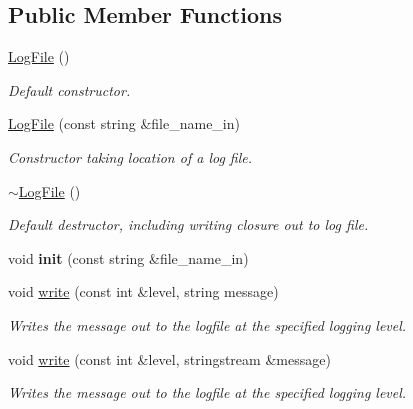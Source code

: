 \subsection*{Public Member Functions}
\begin{DoxyCompactItemize}
\item 
\hyperlink{class_log_file_ad11b3baf5602575c1396f726d3598188}{Log\+File} ()\hypertarget{class_log_file_ad11b3baf5602575c1396f726d3598188}{}\label{class_log_file_ad11b3baf5602575c1396f726d3598188}

\begin{DoxyCompactList}\small\item\em Default constructor. \end{DoxyCompactList}\item 
\hyperlink{class_log_file_a0b1339474eda3eb8bed23dce67fa55b0}{Log\+File} (const string \&file\+\_\+name\+\_\+in)
\begin{DoxyCompactList}\small\item\em Constructor taking location of a log file. \end{DoxyCompactList}\item 
\hyperlink{class_log_file_a440a7de2dcbb9facb68e56dc47cb9dea}{$\sim$\+Log\+File} ()\hypertarget{class_log_file_a440a7de2dcbb9facb68e56dc47cb9dea}{}\label{class_log_file_a440a7de2dcbb9facb68e56dc47cb9dea}

\begin{DoxyCompactList}\small\item\em Default destructor, including writing closure out to log file. \end{DoxyCompactList}\item 
void {\bfseries init} (const string \&file\+\_\+name\+\_\+in)\hypertarget{class_log_file_a8f245a5659dba714deb45c8e93ce9681}{}\label{class_log_file_a8f245a5659dba714deb45c8e93ce9681}

\item 
void \hyperlink{class_log_file_ad8acf8bc3a616ad47f43307781ea3c63}{write} (const int \&level, string message)
\begin{DoxyCompactList}\small\item\em Writes the message out to the logfile at the specified logging level. \end{DoxyCompactList}\item 
void \hyperlink{class_log_file_a08c10809b0095438671be7603e1a53ae}{write} (const int \&level, stringstream \&message)
\begin{DoxyCompactList}\small\item\em Writes the message out to the logfile at the specified logging level. \end{DoxyCompactList}\end{DoxyCompactItemize}
